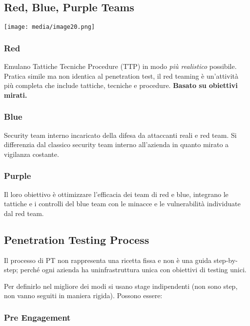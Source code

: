 \subsection{Red, Blue, Purple Teams}\label{red-blue-purple-teams}

\texttt{[image: media/image20.png]}

\subsubsection{Red}\label{red}

Emulano Tattiche Tecniche Procedure (TTP) in modo \emph{più realistico}
possibile. Pratica simile ma non identica al penetration test, il red
teaming è un'attività più completa che include tattiche, tecniche e
procedure. \textbf{Basato su obiettivi mirati.}

\subsubsection{Blue}\label{blue}

Security team interno incaricato della difesa da attaccanti reali e red
team. Si differenzia dal classico security team interno all'azienda in
quanto mirato a vigilanza costante.

\subsubsection{Purple}\label{purple}

Il loro obiettivo è ottimizzare l'efficacia dei team di red e blue,
integrano le tattiche e i controlli del blue team con le minacce e le
vulnerabilità individuate dal red team.

\subsection{Penetration Testing
Process}\label{penetration-testing-process}

Il processo di PT non rappresenta una ricetta fissa e non è una guida
step-by-step; perché ogni azienda ha un\textquotesingle infrastruttura
unica con obiettivi di testing unici.

Per definirlo nel migliore dei modi si usano stage indipendenti (non
sono step, non vanno seguiti in maniera rigida). Possono essere:

\subsubsection{Pre Engagement}\label{pre-engagement}

